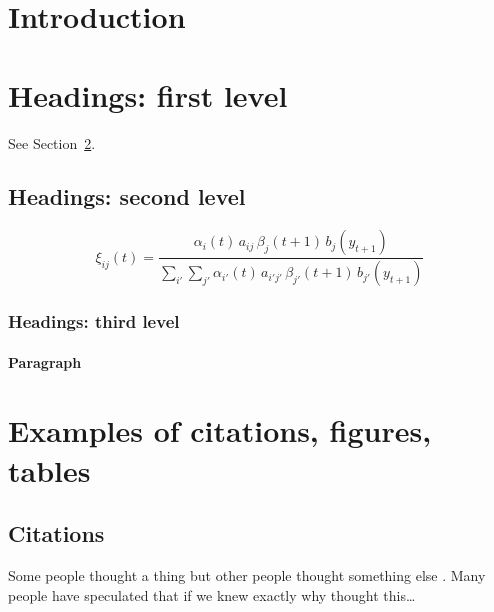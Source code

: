\begin{abstract}
Write your abstract here. Summarise the problem, the approach, the main results, and the conclusions in a few sentences.
\end{abstract}



\section{Introduction}
\lipsum[2]
\lipsum[3]


\section{Headings: first level}
\label{sec:headings}

\lipsum[4] See Section~\ref{sec:headings}.

\subsection{Headings: second level}
\lipsum[5]
\begin{equation}
	\xi_{ij}(t) = \frac{\alpha_i(t)\, a_{ij}\, \beta_j(t+1)\, b_j(y_{t+1})}
	                   {\sum_{i'}\sum_{j'} \alpha_{i'}(t)\, a_{i'j'}\, \beta_{j'}(t+1)\, b_{j'}(y_{t+1})}
\end{equation}

\subsubsection{Headings: third level}
\lipsum[6]

\paragraph{Paragraph}
\lipsum[7]


\section{Examples of citations, figures, tables}
\label{sec:others}

\subsection{Citations}
Some people thought a thing \citep{kour2014real, keshet2016prediction} but other people thought something else \citep{kour2014fast}. Many people have speculated that if we knew exactly why \citet{kour2014fast} thought this\dots

